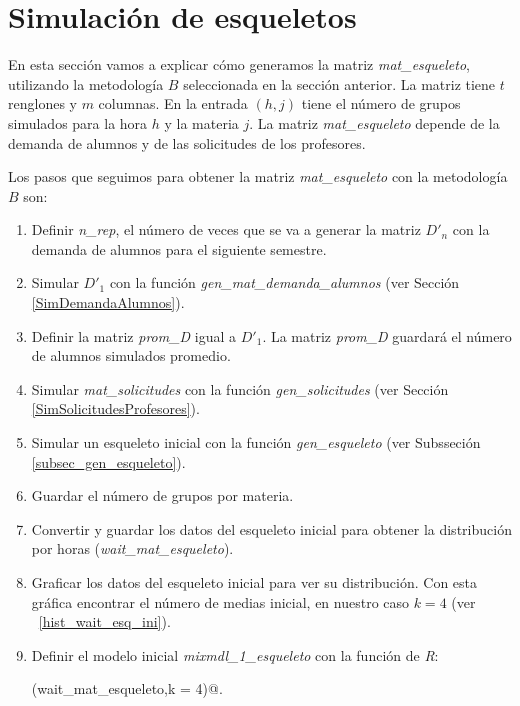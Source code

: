 \section{Simulación de esqueletos} \label{sec_esqueletos}
En esta sección vamos a explicar cómo generamos la matriz \textit{mat\_esqueleto}, utilizando la metodología $B$ seleccionada en la sección anterior. La matriz tiene $t$ renglones y $m$ columnas. En la entrada $(h,j)$ tiene el número de grupos simulados para la hora $h$ y la materia $j$. La matriz \textit{mat\_esqueleto} depende de la demanda de alumnos y de las solicitudes de los profesores.


Los pasos que seguimos para obtener la matriz \textit{mat\_esqueleto} con la metodología $B$ son:

\begin{enumerate}
\item Definir \textit{n\_rep}, el número de veces que se va a generar la matriz $D'_{n}$ con la demanda de alumnos para el siguiente semestre.

\item Simular $D'_{1}$ con la función \textit{gen\_mat\_demanda\_alumnos} (ver Sección \ref{SimDemandaAlumnos}).

\item Definir la matriz \textit{prom\_D} igual a $D'_{1}$. La matriz \textit{prom\_D} guardará el número de alumnos simulados promedio.

\item Simular \textit{mat\_solicitudes} con la función \textit{gen\_solicitudes} (ver Sección \ref{SimSolicitudesProfesores}).

\item Simular un esqueleto inicial con la función \textit{gen\_esqueleto} (ver Subsseción \ref{subsec_gen_esqueleto}).

\item Guardar el número de grupos por materia.

\item Convertir y guardar los datos del esqueleto inicial para obtener la distribución por horas (\textit{wait\_mat\_esqueleto}).

\item Graficar los datos del esqueleto inicial para ver su distribución. Con esta gráfica encontrar el número de medias inicial, en nuestro caso $k = 4$ (ver \figurename{~\ref{hist_wait_esq_ini}}).

\item Definir el modelo inicial \textit{mixmdl\_1\_esqueleto} con la función de \textit{R}:

\verb@normalmixEM(wait_mat_esqueleto,k = 4)@.
\end{enumerate}

